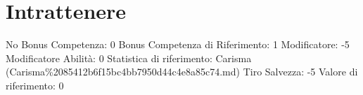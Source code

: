 \section{Intrattenere}\label{intrattenere}

\begin{description}
\tightlist
\item[Tags: ABI]
No Bonus Competenza: 0 Bonus Competenza di Riferimento: 1 Modificatore:
-5 Modificatore Abilità: 0 Statistica di riferimento: Carisma
(Carisma\%2085412b6f15bc4bb7950d44c4e8a85c74.md) Tiro Salvezza: -5
Valore di riferimento: 0
\end{description}
